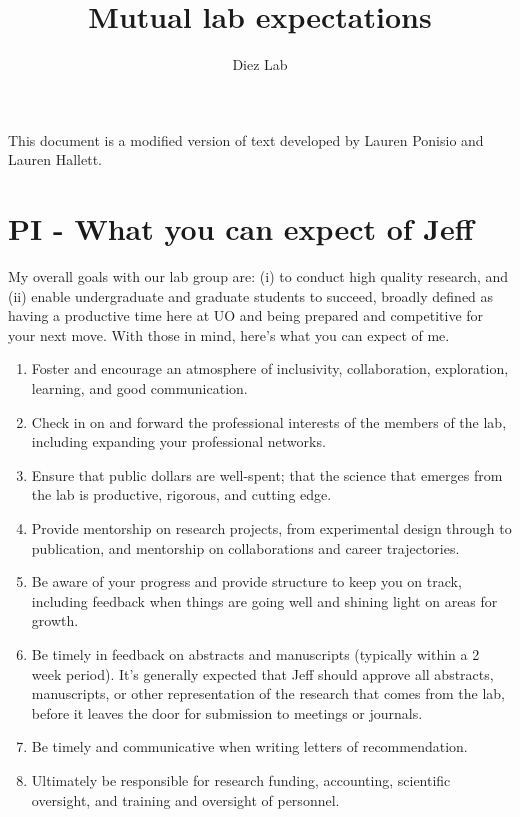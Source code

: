 \documentclass[12pt]{article}
\title{Mutual lab expectations}
\subtitle{ }
\author{Diez Lab}
\begin{document}
\maketitle

This document is a modified version of text developed by Lauren Ponisio and Lauren Hallett.

\section{PI - What you can expect of Jeff}
My overall goals with our lab group are: (i) to conduct high quality research, and (ii) enable undergraduate and graduate students to succeed, broadly defined as having a productive time here at UO and being prepared and competitive for your next move.  With those in mind, here's what you can expect of me.

\begin{enumerate}
\item Foster and encourage an atmosphere of inclusivity, collaboration, exploration, learning, and good communication.
\item Check in on and forward the professional interests of the members of the lab, including expanding your professional networks.
\item Ensure that public dollars are well-spent; that the science that emerges from the lab is productive, rigorous, and cutting edge.

\item Provide mentorship on research projects, from experimental design through to publication, and mentorship on collaborations and career trajectories.
\item Be aware of your progress and provide structure to keep you on track, including feedback when things are going well and shining light on areas for growth.
\item Be timely in feedback on abstracts and manuscripts (typically within a 2 week period).
It's generally expected that Jeff should approve all abstracts, manuscripts, or other representation of the research that comes from the lab, before it leaves the door for submission to meetings or journals.
\item Be timely and communicative when writing letters of recommendation.
\item Ultimately be responsible for research funding, accounting,  scientific oversight, and training and oversight of personnel.
\end{enumerate}
\end{document}
